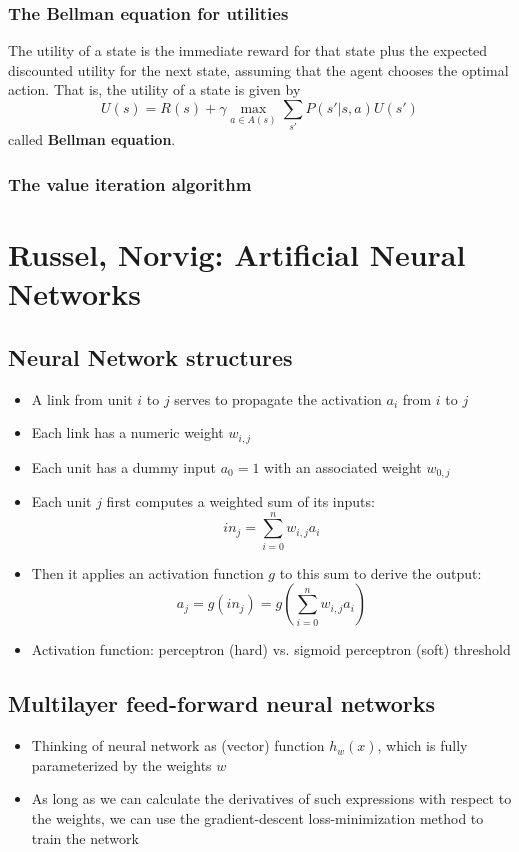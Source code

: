 \documentclass{scrartcl}
\begin{document}
\subsubsection{The Bellman equation for utilities}
The utility of a state is the immediate reward for that state plus the expected discounted utility for the next state, assuming that the agent chooses the optimal action. That is, the utility of a state is given by
\[U(s) = R(s) + \gamma \max_{a\in A(s)} \sum_{s'} P(s'|s,a) U(s')\]
called \textbf{Bellman equation}.

\subsubsection{The value iteration algorithm}






\newpage
\section{Russel, Norvig: Artificial Neural Networks}
\subsection{Neural Network structures}
\begin{itemize}
    \item
        A link from unit \(i\) to \(j\) serves to propagate the activation \(a_i\) from \(i\) to \(j\)
    \item
        Each link has a numeric weight \(w_{i,j}\)
    \item
        Each unit has a dummy input \(a_0 = 1\) with an associated weight \(w_{0,j}\)
    \item
        Each unit \(j\) first computes a weighted sum of its inputs: \[in_j = \sum_{i=0}^n w_{i,j} a_i\]
    \item
        Then it applies an activation function \(g\) to this sum to derive the output:
        \[a_j = g(in_j) = g(\sum_{i=0}^n w_{i,j} a_i)\]
    \item
        Activation function: perceptron (hard) vs. sigmoid perceptron (soft) threshold
\end{itemize}
\subsection{Multilayer feed-forward neural networks}
\begin{itemize}
    \item
        Thinking of neural network as (vector) function \(h_w(x)\), which is fully parameterized by the weights \(w\) 
    \item
        As long as we can calculate the derivatives of such expressions with respect to the weights, we can use the gradient-descent loss-minimization method to train the network
\end{itemize}
\end{document}
